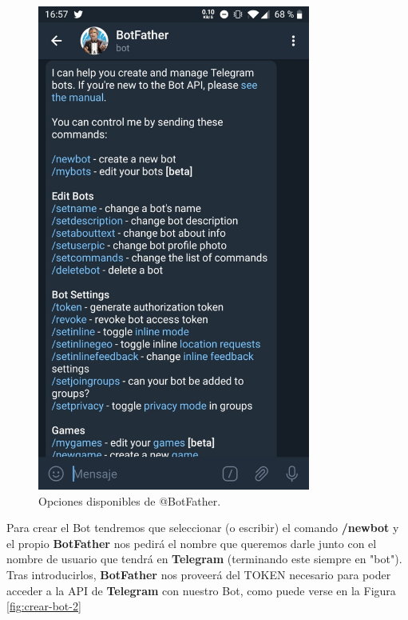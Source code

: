 \begin{figure}[p]
	\centering
	\includegraphics[width=0.8\textwidth]{img/crear-bot-1}
	\caption{Opciones disponibles de @BotFather.}
	\label{fig:crear-bot-1}
\end{figure}

Para crear el Bot tendremos que seleccionar (o escribir) el comando \textbf{/newbot} y el propio \textbf{BotFather} nos pedirá el nombre que queremos darle junto con el nombre de usuario que tendrá en \textbf{Telegram} (terminando este siempre en "bot"). Tras introducirlos, \textbf{BotFather} nos proveerá del TOKEN necesario para poder acceder a la API de \textbf{Telegram} con nuestro Bot, como puede verse en la Figura \ref{fig:crear-bot-2}

